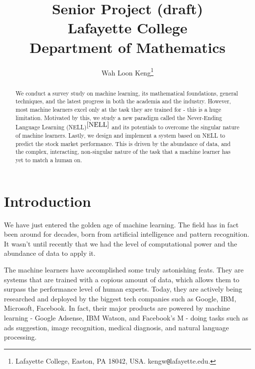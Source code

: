 \documentclass[12pt]{article}  %
\begin{document}
\title{Senior Project (draft)\\
Lafayette College \\
Department of Mathematics
}

\author{
{Wah Loon Keng}\thanks{
Lafayette College,
Easton, PA 18042, USA.
kengw{\tt @}lafayette.edu.}
}
\maketitle


\begin{abstract}
We conduct a survey study on machine learning, its mathematical foundations, general techniques, and the latest progress in both the academia and the industry. However, most machine learners  excel only at the task they are trained for - this is a huge limitation. Motivated by this, we study a new paradigm called the Never-Ending Language Learning (NELL)$^{\ref{NELL}}$ and its potentials to overcome the singular nature of machine learners. Lastly, we design and implement a system based on NELL to predict the stock market performance. This is driven by the abundance of data, and the complex, interacting, non-singular nature of the task that a machine learner has yet to match a human on.
\end{abstract}


\clearpage
\tableofcontents
\clearpage






\section{Introduction} \label{intro}

We have just entered the golden age of machine learning. The field has in fact been around for decades, born from artificial intelligence and pattern recognition. It wasn't until recently that we had the level of computational power and the abundance of data to apply it. 

The machine learners have accomplished some truly astonishing feats. They are systems that are trained with a copious amount of data, which allows them to surpass the performance level of human experts. Today, they are actively being researched and deployed by the biggest tech companies such as Google, IBM, Microsoft, Facebook. In fact, their major products are powered by machine learning - Google Adsense, IBM Watson, and Facebook's M - doing tasks such as ads suggestion, image recognition, medical diagnosis, and natural language processing.
\end{document}
